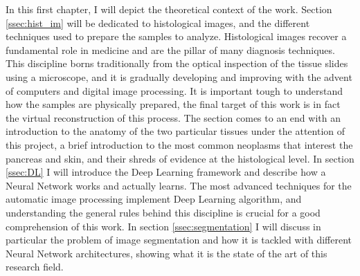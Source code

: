 In this first chapter, I will depict the theoretical context of the work. Section \ref{ssec:hist_im} will be dedicated to histological images, and the different techniques used to prepare the samples to analyze. Histological images recover a fundamental role in medicine and are the pillar of many diagnosis techniques. This discipline borns traditionally from the optical inspection of the tissue slides using a microscope, and it is gradually developing and improving with the advent of computers and digital image processing. It is important tough to understand how the samples are physically prepared, the final target of this work is in fact the virtual reconstruction of this process. The section comes to an end with an introduction to the anatomy of the two particular tissues under the attention of this project, a brief introduction to the most common neoplasms that interest the pancreas and skin, and their shreds of evidence at the histological level. In section \ref{ssec:DL} I will introduce the Deep Learning framework and describe how a Neural Network works and actually learns. The most advanced techniques for the automatic image processing implement Deep Learning algorithm, and understanding the general rules behind this discipline is crucial for a good comprehension of this work. In section \ref{ssec:segmentation} I will discuss in particular the problem of image segmentation and how it is tackled with different Neural Network architectures, showing what it is the state of the art of this research field.
